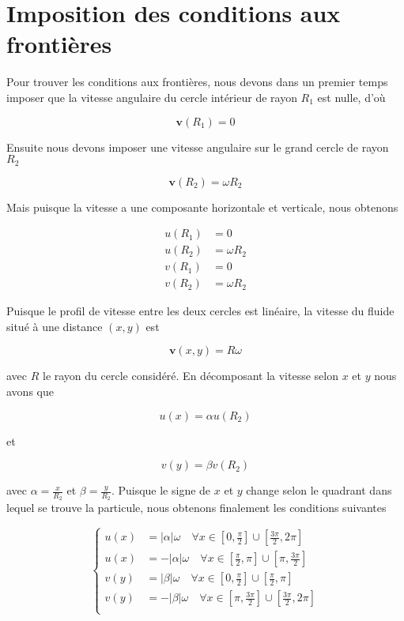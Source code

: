 \documentclass{article}
\theoremstyle{definition}
\begin{document}
\newpage

\section{Imposition des conditions aux frontières}

Pour trouver les conditions aux frontières, nous devons dans un premier temps imposer que la vitesse angulaire du cercle intérieur de rayon $R_1$ est nulle, d'où 

$$ \mathbf{v} (R_1) = 0$$ 

Ensuite nous devons imposer une vitesse angulaire sur le grand cercle de rayon $R_2$

$$ \mathbf{v} (R_2) = \omega R_2$$ 

Mais puisque la vitesse a une composante horizontale et verticale, nous obtenons 

\begin{align*}
u(R_1)& = 0 \\
u(R_2) &= \omega R_2\\
v(R_1)& = 0\\
v(R_2) &= \omega R_2
\end{align*}

Puisque le profil de vitesse entre les deux cercles est linéaire, la vitesse du fluide situé à une distance $(x,y)$ est 

$$\mathbf{v} (x,y) = R \omega$$

avec $R$ le rayon du cercle considéré. En décomposant la vitesse selon $x$ et $y$ nous avons que 

$$u(x)= \alpha u(R_2)$$

et

$$v(y)= \beta v(R_2)$$

avec $\alpha = \frac{x}{R_2}$ et $\beta = \frac{y}{R_2}$. Puisque le signe de $x$ et $y$ change selon le quadrant dans lequel se trouve la particule, nous obtenons finalement les conditions suivantes 

\begin{equation*}
  \left\{
      \begin{aligned}
       u(x)&= |\alpha | \omega \quad \forall x \in [0, \frac{\pi}{2}] \cup [\frac{3 \pi}{2}, 2\pi]\\
       u(x)&= -|\alpha | \omega \quad \forall x \in [ \frac{\pi}{2}, \pi] \cup [ \pi, \frac{3 \pi}{2}]\\
       v(y)&= |\beta | \omega \quad \forall x \in [0, \frac{\pi}{2}] \cup [\frac{\pi}{2} , \pi]\\
       v(y)&= -|\beta | \omega \quad \forall x \in [\pi, \frac{3\pi}{2}] \cup [\frac{3\pi}{2} , 2\pi]\\
      \end{aligned}
    \right.
\end{equation*}
\end{document}
